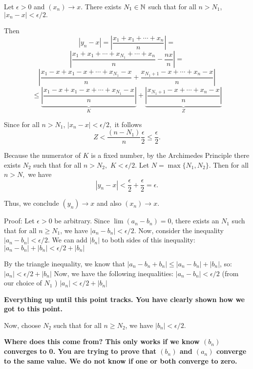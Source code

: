 \documentclass{report}
\begin{document}
\bigskip
\begin{myproof}
    
 Let $\epsilon >0 $ and $(x_n) \rightarrow x$.  There exists $N_1 \in \NN$ such that for all $n > N_1$, $| x_{n} - x| < \epsilon/2.$

  Then $$|y_n -x| = \left| \frac{x_1 + x_1 +\cdots + x_{n} }{n}  \right|= $$$$ \left| \frac{x_1 + x_1 + \cdots + x_{N_1}+ \cdots + x_{n} }{n}  - \frac{nx}{n}\right|= $$
  $$ \left| \frac{x_1 - x + x_1 - x+ \cdots + x_{N_1} - x}{n} + \frac{ x_{N_1+1} -x + \cdots + x_{n} -x }{n}  \right|  $$
  $$ \leq \underbrace{\left| \frac{x_1 -x + x_1  -x+ \cdots + x_{N_1} -x }{n} \right|}_{K}+ \underbrace{ \left|\frac{ x_{N_1 + 1} -x + \cdots + x_{n} -x  }{n}\right|}_{Z}$$

Since for all $n>N_1$, $| x_{n} - x| < \epsilon/2,$ it follows $$Z< \frac{(n - N_1)}{n} \frac{\epsilon}{2} \leq \frac{\epsilon}{2}.$$


Because the numerator of $K$ is a fixed number, by the Archimedes Principle there exists $N_2$ such that for all $n>N_2,$ $K < \epsilon/2.$ Let $N = \max\{N_1,N_2\}.$ Then for all $n > N,$ we have $$|y_n -x| < \frac{\epsilon}{2} + \frac{\epsilon}{2} = \epsilon.$$

Thus, we  conclude  $(y_n) \rightarrow x$ and also $(x_n) \rightarrow x.$
\bigskip
\end{myproof}



Proof:
Let $\epsilon>0$ be arbitrary. Since $\lim \left(a_n-b_n\right)=0$, there exists an $N_1$ such that for all $n \geq N_1$, we have $\left|a_n-b_n\right|<\epsilon / 2$. Now, consider the inequality $\left|a_n-b_n\right|<\epsilon / 2$. We can add $\left|b_n\right|$ to both sides of this inequality: $\left|a_n-b_n\right|+\left|b_n\right|<\epsilon / 2+\left|b_n\right|$

By the triangle inequality, we know that $\left|a_n-b_n+b_n\right| \leq\left|a_n-b_n\right|+\left|b_n\right|$, so: $\left|a_n\right|<\epsilon / 2+\left|b_n\right|$ Now, we have the following inequalities: $\left|a_n-b_n\right|<\epsilon / 2$ (from our choice of $N_1$ )
$\left|a_n\right|<\epsilon / 2+\left|b_n\right|$
\par
\textbf{Everything up until this point tracks. You have clearly shown how we got to this point.}
\par
Now, choose $N_2$ such that for all $n \geq N_2$, we have $\left|b_n\right|<\epsilon / 2$. 
\par
\textbf{Where does this come from? This only works if we know $(b_n)$ converges to 0. You are trying to prove that $(b_n)$ and $(a_n)$ converge to the same value. We do not know if one or both converge to zero.}
\end{document}
